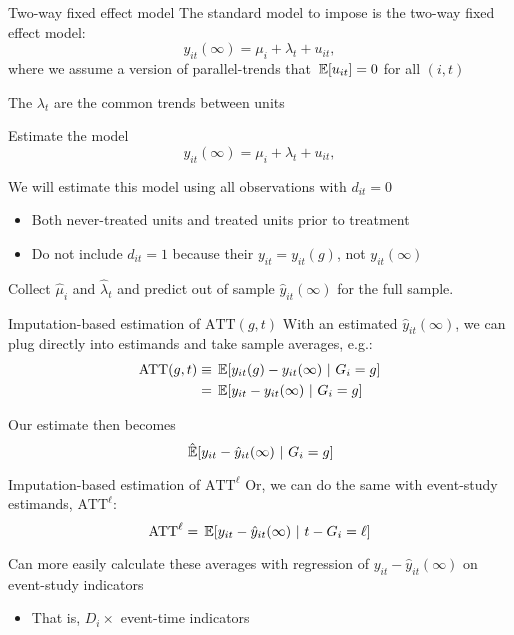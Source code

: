 \documentclass[aspectratio=169,t,11pt,table]{beamer}
\begin{document}
\begin{frame}{Two-way fixed effect model}
  The standard model to impose is the two-way fixed effect model:
  $$
    y_{it}(\infty) = \mu_i + \lambda_t  + u_{it},
  $$
  where we assume a version of parallel-trends that $\expec{u_{it}} = 0$ for all $(i, t)$

  \bigskip
  The $\lambda_t$ are the common trends between units
\end{frame}

\begin{frame}{Estimate the model}
  \vspace*{-\bigskipamount}
  $$
    y_{it}(\infty) = \mu_i + \lambda_t  + u_{it},
  $$
  
  We will estimate this model using all observations with $d_{it} = 0$
  \begin{itemize}
    \item Both never-treated units and treated units prior to treatment
    
    \item Do not include $d_{it} = 1$ because their $y_{it} = y_{it}(g)$, not $y_{it}(\infty)$
  \end{itemize}

  \pause
  \bigskip
  Collect $\hat{\mu}_i$ and $\hat{\lambda}_t$ and predict out of sample $\hat{y}_{it}(\infty)$ for the full sample.
\end{frame}

\begin{frame}{Imputation-based estimation of $\text{ATT}(g,t)$}
  With an estimated $\hat{y}_{it}(\infty)$, we can plug directly into estimands and take sample averages, e.g.:
  \begin{align*}
    \text{ATT}(g,t) &\equiv 
    \expec{y_{it}(g) - y_{it}(\infty)}{G_i = g} \\
    &= \expec{y_{it} - y_{it}(\infty)}{G_i = g}
  \end{align*}

  Our estimate then becomes
  $$
    \expechat{y_{it} - \hat{y}_{it}(\infty)}{G_i = g}
  $$
\end{frame}

\begin{frame}{Imputation-based estimation of $\text{ATT}^\ell$}
  Or, we can do the same with event-study estimands, $\text{ATT}^\ell$:
  $$
    \text{ATT}^\ell = \expec{y_{it} - \hat{y}_{it}(\infty)}{t - G_i = \ell}
  $$

  \bigskip
  Can more easily calculate these averages with regression of $y_{it} - \hat{y}_{it}(\infty)$ on event-study indicators 
  \begin{itemize}
    \item That is, $D_i \times$ event-time indicators
  \end{itemize}
\end{frame}
\end{document}
